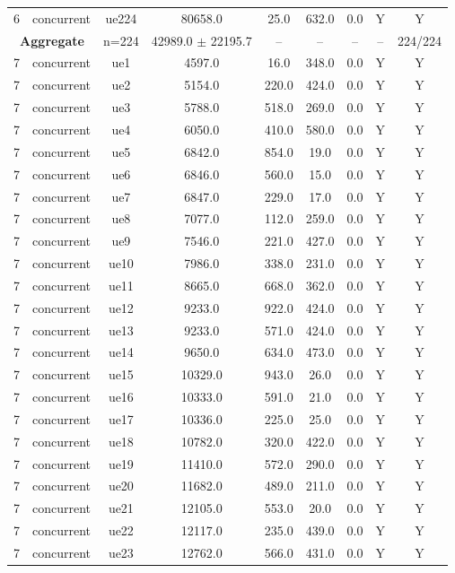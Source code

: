 \begin{table}[ht]
\begin{tabular}{|c|c|c|c|c|c|c|c|c|}
6 & concurrent & ue224 & 80658.0 & 25.0 & 632.0 & 0.0 & Y & Y \\
\multicolumn{2}{|c|}{\textbf{Aggregate}} & n=224 & 42989.0 $\pm$ 22195.7 & -- & -- & -- & -- & 224/224 \\
\hline
7 & concurrent & ue1 & 4597.0 & 16.0 & 348.0 & 0.0 & Y & Y \\
7 & concurrent & ue2 & 5154.0 & 220.0 & 424.0 & 0.0 & Y & Y \\
7 & concurrent & ue3 & 5788.0 & 518.0 & 269.0 & 0.0 & Y & Y \\
7 & concurrent & ue4 & 6050.0 & 410.0 & 580.0 & 0.0 & Y & Y \\
7 & concurrent & ue5 & 6842.0 & 854.0 & 19.0 & 0.0 & Y & Y \\
7 & concurrent & ue6 & 6846.0 & 560.0 & 15.0 & 0.0 & Y & Y \\
7 & concurrent & ue7 & 6847.0 & 229.0 & 17.0 & 0.0 & Y & Y \\
7 & concurrent & ue8 & 7077.0 & 112.0 & 259.0 & 0.0 & Y & Y \\
7 & concurrent & ue9 & 7546.0 & 221.0 & 427.0 & 0.0 & Y & Y \\
7 & concurrent & ue10 & 7986.0 & 338.0 & 231.0 & 0.0 & Y & Y \\
7 & concurrent & ue11 & 8665.0 & 668.0 & 362.0 & 0.0 & Y & Y \\
7 & concurrent & ue12 & 9233.0 & 922.0 & 424.0 & 0.0 & Y & Y \\
7 & concurrent & ue13 & 9233.0 & 571.0 & 424.0 & 0.0 & Y & Y \\
7 & concurrent & ue14 & 9650.0 & 634.0 & 473.0 & 0.0 & Y & Y \\
7 & concurrent & ue15 & 10329.0 & 943.0 & 26.0 & 0.0 & Y & Y \\
7 & concurrent & ue16 & 10333.0 & 591.0 & 21.0 & 0.0 & Y & Y \\
7 & concurrent & ue17 & 10336.0 & 225.0 & 25.0 & 0.0 & Y & Y \\
7 & concurrent & ue18 & 10782.0 & 320.0 & 422.0 & 0.0 & Y & Y \\
7 & concurrent & ue19 & 11410.0 & 572.0 & 290.0 & 0.0 & Y & Y \\
7 & concurrent & ue20 & 11682.0 & 489.0 & 211.0 & 0.0 & Y & Y \\
7 & concurrent & ue21 & 12105.0 & 553.0 & 20.0 & 0.0 & Y & Y \\
7 & concurrent & ue22 & 12117.0 & 235.0 & 439.0 & 0.0 & Y & Y \\
7 & concurrent & ue23 & 12762.0 & 566.0 & 431.0 & 0.0 & Y & Y \\

\end{tabular}
\end{table}
